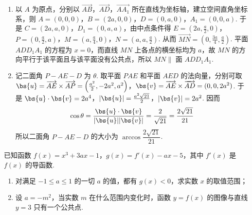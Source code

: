 \begin{solution}
\begin{enumerate}
\item 以 \(A\) 为原点，分别以 \(\overrightarrow{AB}\)，\(\overrightarrow{AD}\)，\(\overrightarrow{AA_1}\) 所在直线为坐标轴，建立空间直角坐标系，则
\(A=(0,0,0)\)，\(B=(2a,0,0)\)，\(D=(0,a,0)\)，\(A_1=(0,0,a)\).
于是 \(C=(2a,a,0)\)，\(D_1=(0,a,a)\)，由中点条件得
\(E=\left(2a,\frac{a}{2},0\right)\)，\(P=\left(0,\frac{a}{2},a\right)\)，\(M=\left(a,\frac{a}{4},0\right)\)，\(N=\left(a,a,\frac{a}{2}\right)\).
从而 \(\overrightarrow{MN}=\left(0,\frac{3a}{4},\frac{a}{2}\right)\). 平面 \(ADD_1A_1\) 的方程为 \(x=0\)，而直线 \(MN\) 上各点的横坐标均为 \(a\)，故 \(MN\) 的方向平行于该平面且与该平面没有公共点，所以 \(MN\parallel\) 面 \(ADD_1A_1\).

\item 记二面角 \(P-AE-D\) 为 \(\theta\). 取平面 \(PAE\) 和平面 \(AED\) 的法向量，分别可取
\(\bs{u}=\overrightarrow{AE}\times\overrightarrow{AP}=\left(\frac{a^2}{2},-2a^2,a^2\right)\)，\(\bs{v}=\overrightarrow{AE}\times\overrightarrow{AD}=(0,0,2a^2)\).
于是 \(\bs{u}\cdot\bs{v}=2a^4\)，\(\lvert\bs{u}\rvert=\frac{a^2\sqrt{21}}{2}\)，\(\lvert\bs{v}\rvert=2a^2\). 因而
\[
\cos\theta=\frac{\bs{u}\cdot\bs{v}}{\lvert\bs{u}\rvert\lvert\bs{v}\rvert}=\frac{2}{\sqrt{21}}=\frac{2\sqrt{21}}{21}
\]
所以二面角 \(P-AE-D\) 的大小为 \(\arccos\dfrac{2\sqrt{21}}{21}\).
\end{enumerate}
\end{solution}

\begin{problem}
已知函数 \(f(x) = x^3 + 3ax - 1\)，\(g(x) = f'(x) - ax - 5\)，其中 \(f'(x)\) 是 \(f(x)\) 的导函数.

\begin{enumerate}
\item 对满足 \(-1 \leqslant a \leqslant 1\) 的一切 \(a\) 的值，都有 \(g(x) < 0\)，求实数 \(x\) 的取值范围；
\item 设 \(a = -m^2\)，当实数 \(m\) 在什么范围内变化时，函数 \(y = f(x)\) 的图像与直线 \(y = 3\) 只有一个公共点.
\end{enumerate}
\end{problem}

